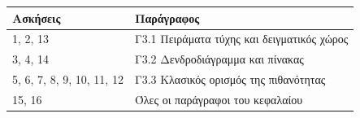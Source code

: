 
\begin{center}
\renewcommand{\arraystretch}{1.3}
\begin{tabular}{ll}
\toprule
\textbf{Ασκήσεις} & \textbf{Παράγραφος}\\
\midrule
1, 2, 13 & Γ3.1 Πειράματα τύχης και δειγματικός χώρος\\
3, 4, 14 & Γ3.2 Δενδροδιάγραμμα και πίνακας\\
5, 6, 7, 8, 9, 10, 11, 12 & Γ3.3 Κλασικός ορισμός της πιθανότητας\\
15, 16 & Όλες οι παράγραφοι του κεφαλαίου\\
\bottomrule
\end{tabular}
\end{center}
